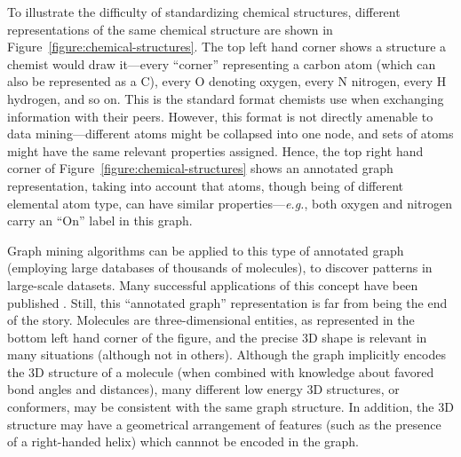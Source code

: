 \documentclass{sig-alternate}
\begin{document}
To illustrate the difficulty of standardizing chemical structures,
different representations of the same chemical structure are shown in
Figure~\ref{figure:chemical-structures}. The top left hand corner
shows a structure a chemist would draw it---every ``corner''
representing a carbon atom (which can also be represented as a C),
every O denoting oxygen, every N nitrogen, every H hydrogen, and so
on. This is the standard format chemists use when exchanging
information with their peers.  However, this format is not directly
amenable to data mining---different atoms might be collapsed into one
node, and sets of atoms might have the same relevant properties
assigned. Hence, the top right hand corner of
Figure~\ref{figure:chemical-structures} shows an annotated graph
representation, taking into account that atoms, though being of
different elemental atom type, can have similar
properties---\emph{e.g.}, both oxygen and nitrogen carry an ``On''
label in this graph.


Graph mining algorithms can be applied to this type of annotated graph
(employing large databases of thousands of molecules), to discover
patterns in large-scale datasets.  Many successful applications of
this concept have been published \cite{wegner2006,horst2009}. Still,
this ``annotated graph'' representation is far from being the end of
the story. Molecules are three-dimensional entities, as represented in
the bottom left hand corner of the figure, and the precise 3D shape is
relevant in many situations (although not in others). Although the
graph implicitly encodes the 3D structure of a molecule (when combined
with knowledge about favored bond angles and distances), many
different low energy 3D structures, or conformers, may be consistent
with the same graph structure. In addition, the 3D structure may have
a geometrical arrangement of features (such as the presence of a
right-handed helix) which cannnot be encoded in the graph.
\end{document}
